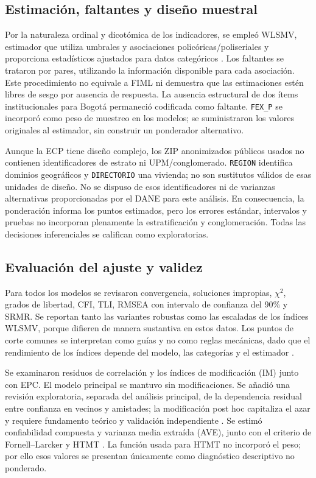 \documentclass[11pt,letterpaper]{article}
\begin{document}
\subsection{Estimación, faltantes y diseño muestral}

Por la naturaleza ordinal y dicotómica de los indicadores, se empleó WLSMV, estimador que utiliza umbrales y asociaciones policóricas/poliseriales y proporciona estadísticos ajustados para datos categóricos \citep{Li2016,Rosseel2012}. Los faltantes se trataron por pares, utilizando la información disponible para cada asociación. Este procedimiento no equivale a FIML ni demuestra que las estimaciones estén libres de sesgo por ausencia de respuesta. La ausencia estructural de dos ítems institucionales para Bogotá permaneció codificada como faltante. \texttt{FEX\_P} se incorporó como peso de muestreo en los modelos; se suministraron los valores originales al estimador, sin construir un ponderador alternativo.

Aunque la ECP tiene diseño complejo, los ZIP anonimizados públicos usados no contienen identificadores de estrato ni UPM/conglomerado. \texttt{REGION} identifica dominios geográficos y \texttt{DIRECTORIO} una vivienda; no son sustitutos válidos de esas unidades de diseño. No se dispuso de esos identificadores ni de varianzas alternativas proporcionadas por el DANE para este análisis. En consecuencia, la ponderación informa los puntos estimados, pero los errores estándar, intervalos y pruebas no incorporan plenamente la estratificación y conglomeración. Todas las decisiones inferenciales se califican como exploratorias.

\subsection{Evaluación del ajuste y validez}

Para todos los modelos se revisaron convergencia, soluciones impropias, \(\chi^2\), grados de libertad, CFI, TLI, RMSEA con intervalo de confianza del 90\% y SRMR. Se reportan tanto las variantes robustas como las escaladas de los índices WLSMV, porque difieren de manera sustantiva en estos datos. Los puntos de corte comunes se interpretan como guías y no como reglas mecánicas, dado que el rendimiento de los índices depende del modelo, las categorías y el estimador \citep{HuBentler1999,Marsh2004,XiaYang2019}.

Se examinaron residuos de correlación y los índices de modificación (IM) junto con EPC. El modelo principal se mantuvo sin modificaciones. Se añadió una revisión exploratoria, separada del análisis principal, de la dependencia residual entre confianza en vecinos y amistades; la modificación post hoc capitaliza el azar y requiere fundamento teórico y validación independiente \citep{MacCallum1992,Kline2023}. Se estimó confiabilidad compuesta y varianza media extraída (AVE), junto con el criterio de Fornell--Larcker y HTMT \citep{FornellLarcker1981,Henseler2015}. La función usada para HTMT no incorporó el peso; por ello esos valores se presentan únicamente como diagnóstico descriptivo no ponderado.
\end{document}
